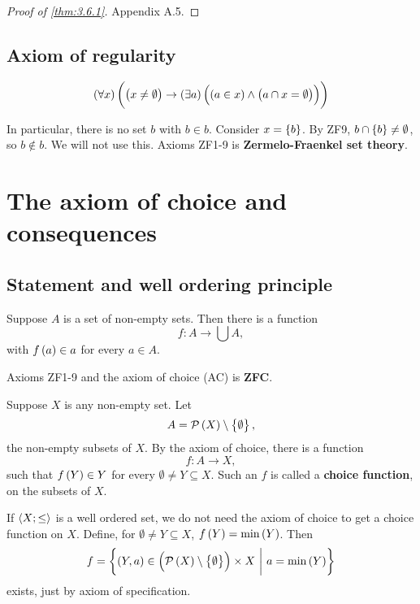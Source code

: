 \begin{proof}[Proof of \ref{thm:3.6.1}]
Appendix A.5.
\end{proof}

\subsection{Axiom of regularity}

\begin{axiom**}
$$ \fab{x}\impb{\neb{x}{\emptyset}}{\teb{a}\andb{\inb{a}{x}}{\eqb{a \cap x}{\emptyset}}} $$
\end{axiom**}

In particular, there is no set $ b $ with $ b \in b $. Consider $ x = \cbr{b} $. By ZF9, $ b \cap \cbr{b} \ne \emptyset $, so $ b \notin b $. We will not use this. Axioms ZF1-9 is \textbf{Zermelo-Fraenkel set theory}.

\pagebreak

\section{The axiom of choice and consequences}

\subsection{Statement and well ordering principle}

\begin{definition}
Suppose $ A $ is a set of non-empty sets. Then there is a function
$$ f : A \to \bigcup A, $$
with $ f\br{a} \in a $ for every $ a \in A $.
\end{definition}

Axioms ZF1-9 and the axiom of choice (AC) is \textbf{ZFC}.

\begin{example}
Suppose $ X $ is any non-empty set. Let
$$ A = \PPP\br{X} \setminus \cbr{\emptyset}, $$
the non-empty subsets of $ X $. By the axiom of choice, there is a function
$$ f : A \to X, $$
such that $ f\br{Y} \in Y $ for every $ \emptyset \ne Y \subseteq X $. Such an $ f $ is called a \textbf{choice function}, on the subsets of $ X $.
\end{example}

\begin{note*}
If $ \left\langle X; \le \right\rangle $ is a well ordered set, we do not need the axiom of choice to get a choice function on $ X $. Define, for $ \emptyset \ne Y \subseteq X $, $ f\br{Y} = \min\br{Y} $. Then
$$ f = \cbr{\br{Y, a} \in \br{\PPP\br{X} \setminus \cbr{\emptyset}} \times X \st a = \min\br{Y}} $$
exists, just by axiom of specification.
\end{note*}

